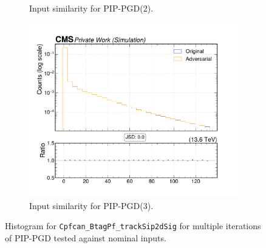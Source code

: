 \begin{figure}[htbp]
\begin{subfigure}[t]{0.32\textwidth}
    \caption*{Input similarity for PIP-PGD(2).}
  \end{subfigure}\hfill
  \begin{subfigure}[t]{0.32\textwidth}
    \includegraphics[width=\linewidth]{media/output/features/compare/combined_it_3/cmp_cpf_arr_Cpfcan_BtagPf_trackSip2dSig.pdf}
    \caption*{Input similarity for PIP-PGD(3).}
  \end{subfigure}

  \caption*{Histogram for \texttt{Cpfcan\_BtagPf\_trackSip2dSig} for multiple iterations of PIP-PGD tested against nominal inputs.}
  \label{fig:combined_input_Cpfcan_BtagPf_trackSip2dSig}
\end{figure}

